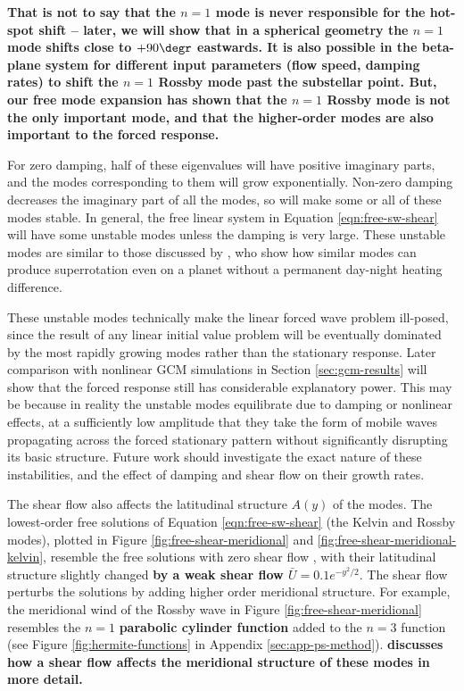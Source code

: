 



\textbf{That is not to say that the $n=1$ mode is never responsible for the hot-spot shift -- later, we will show that in a spherical geometry the $n=1$ mode shifts close to $+90\degr$ eastwards. It is also possible in the beta-plane system for different input parameters (flow speed, damping rates) to shift the $n=1$ Rossby mode past the substellar point. But, our free mode expansion has shown that the $n=1$ Rossby mode is not the only important mode, and that the higher-order modes are also important to the forced response.}

For zero damping, half of these eigenvalues will have positive imaginary parts, and the modes corresponding to them will grow exponentially. Non-zero damping decreases the imaginary part of all the modes, so will make some or all of these modes stable. In general, the free linear system in Equation \ref{eqn:free-sw-shear} will have some unstable modes unless the damping is very large. These unstable modes are similar to those discussed by \citet{wang2014instability}, who show how similar modes can produce superrotation even on a planet without a permanent day-night heating difference.

These unstable modes technically make the linear forced wave problem ill-posed, since the result of any linear initial value problem will be eventually dominated by the most rapidly growing modes rather than the stationary response. Later comparison with nonlinear GCM simulations in Section \ref{sec:gcm-results} will show that the forced response still has considerable explanatory power. This may be because in reality the unstable modes equilibrate due to damping or nonlinear effects, at a sufficiently low amplitude that they take the form of mobile waves propagating across the forced stationary pattern without significantly disrupting its basic structure. Future work should investigate the exact nature of these instabilities, and the effect of damping and shear flow on their growth rates.

The shear flow also affects the latitudinal structure $A(y)$ of the modes. The lowest-order free solutions of Equation \ref{eqn:free-sw-shear} (the Kelvin and Rossby modes), plotted in Figure \ref{fig:free-shear-meridional} and \ref{fig:free-shear-meridional-kelvin}, resemble the free solutions with zero shear flow \citep{matsuno1966quasi}, with their latitudinal structure slightly changed \textbf{by a weak shear flow $\bar{U}=0.1 e^{-y^{2}/2}$}. The shear flow perturbs the solutions by adding higher order meridional structure.  For example, the meridional wind of the Rossby wave in Figure \ref{fig:free-shear-meridional} resembles the $n=1$ \textbf{parabolic cylinder function} added to the $n=3$ function (see Figure \ref{fig:hermite-functions} in Appendix \ref{sec:app-ps-method}). \textbf{\citet{boyd1978shearI} discusses how a shear flow affects the meridional structure of these modes in more detail.}




